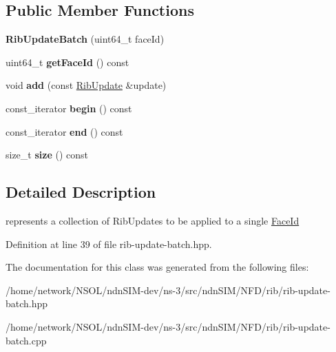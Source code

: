 \subsection*{Public Member Functions}
\begin{DoxyCompactItemize}
\item 
{\bfseries Rib\+Update\+Batch} (uint64\+\_\+t face\+Id)\hypertarget{classnfd_1_1rib_1_1RibUpdateBatch_a223c9f8efaec3e7feae506f240e4d16b}{}\label{classnfd_1_1rib_1_1RibUpdateBatch_a223c9f8efaec3e7feae506f240e4d16b}

\item 
uint64\+\_\+t {\bfseries get\+Face\+Id} () const\hypertarget{classnfd_1_1rib_1_1RibUpdateBatch_af0bcc1bb1a38dd76c9cf7eca46ed9bc8}{}\label{classnfd_1_1rib_1_1RibUpdateBatch_af0bcc1bb1a38dd76c9cf7eca46ed9bc8}

\item 
void {\bfseries add} (const \hyperlink{classnfd_1_1rib_1_1RibUpdate}{Rib\+Update} \&update)\hypertarget{classnfd_1_1rib_1_1RibUpdateBatch_a250795202f56c6532119d7c058c58215}{}\label{classnfd_1_1rib_1_1RibUpdateBatch_a250795202f56c6532119d7c058c58215}

\item 
const\+\_\+iterator {\bfseries begin} () const\hypertarget{classnfd_1_1rib_1_1RibUpdateBatch_af44f401155c4fbad128461e53713912e}{}\label{classnfd_1_1rib_1_1RibUpdateBatch_af44f401155c4fbad128461e53713912e}

\item 
const\+\_\+iterator {\bfseries end} () const\hypertarget{classnfd_1_1rib_1_1RibUpdateBatch_adb8f1e8d6f49dc7f3416f07465f5a670}{}\label{classnfd_1_1rib_1_1RibUpdateBatch_adb8f1e8d6f49dc7f3416f07465f5a670}

\item 
size\+\_\+t {\bfseries size} () const\hypertarget{classnfd_1_1rib_1_1RibUpdateBatch_abf0309d91eacff33e666b6b342aa4a28}{}\label{classnfd_1_1rib_1_1RibUpdateBatch_abf0309d91eacff33e666b6b342aa4a28}

\end{DoxyCompactItemize}


\subsection{Detailed Description}
represents a collection of Rib\+Updates to be applied to a single \hyperlink{classFaceId}{Face\+Id} 

Definition at line 39 of file rib-\/update-\/batch.\+hpp.



The documentation for this class was generated from the following files\+:\begin{DoxyCompactItemize}
\item 
/home/network/\+N\+S\+O\+L/ndn\+S\+I\+M-\/dev/ns-\/3/src/ndn\+S\+I\+M/\+N\+F\+D/rib/rib-\/update-\/batch.\+hpp\item 
/home/network/\+N\+S\+O\+L/ndn\+S\+I\+M-\/dev/ns-\/3/src/ndn\+S\+I\+M/\+N\+F\+D/rib/rib-\/update-\/batch.\+cpp\end{DoxyCompactItemize}
